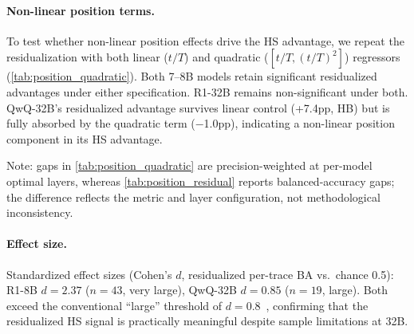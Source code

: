 \paragraph{Non-linear position terms.}
To test whether non-linear position effects drive the HS advantage, we repeat the residualization with both linear ($t/T$) and quadratic ($[t/T, (t/T)^2]$) regressors (\cref{tab:position_quadratic}). Both 7--8B models retain significant residualized advantages under either specification. R1-32B remains non-significant under both. QwQ-32B's residualized advantage survives linear control (+7.4pp, HB) but is fully absorbed by the quadratic term ($-$1.0pp), indicating a non-linear position component in its HS advantage.

\begin{table}[htbp]
\centering
\small
{}
\caption{Linear vs.\ quadratic position residualization (residualized HS$-$text gap, L60 for QwQ-32B). Both 7--8B models are robust to either specification. QwQ-32B's advantage survives linear but not quadratic control; R1-32B is non-significant under both.}
\label{tab:position_quadratic}
\end{table}

Note: gaps in \cref{tab:position_quadratic} are precision-weighted at per-model optimal layers, whereas \cref{tab:position_residual} reports balanced-accuracy gaps; the difference reflects the metric and layer configuration, not methodological inconsistency.

\paragraph{Effect size.} Standardized effect sizes (Cohen's $d$, residualized per-trace BA vs.\ chance 0.5): R1-8B $d{=}2.37$ ($n{=}43$, very large), QwQ-32B $d{=}0.85$ ($n{=}19$, large). Both exceed the conventional ``large'' threshold of $d{=}0.8$~\citep{cohen1988statistical}, confirming that the residualized HS signal is practically meaningful despite sample limitations at 32B.

